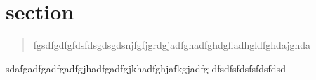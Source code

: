 \newcommand{\institut}{Institut f\"ur Telekommunikationssysteme}
\newcommand{\fachgebiet}{Nachrichten\"ubertragung}
\newcommand{\veranstaltung}{Praktikum Nachrichten\"ubertragung}
\newcommand{\pdfautor}{Dirk Babendererde (321 836), Thomas Kapa (325 219)}
\newcommand{\autor}{Dirk Babendererde (321 836)\\ Thomas Kapa (325 219)}
\newcommand{\gruppe}{Gruppe:}
\newcommand{\betreuer}{Betreuer: Lieven Lange}


\newcommand{\pdftitle}{Nachrichtenuebertragung\ Praktikum\ 05}
\newcommand{\prototitle}{Praktikum 05 \\ Pulsamplitudenmodulation und nichtideale Abtastung}





\section{section}
\begin{quote}
    fgsdfgdfgfdsfdsgdsgdsnjfgfjgrdgjadfghadfghdgfladhgldfghdajghda
\end{quote}


sdafgadfgadfgadfgjhadfgadfgjkhadfghjafkgjadfg
dfsdfsfdsfsfdsfdsd

